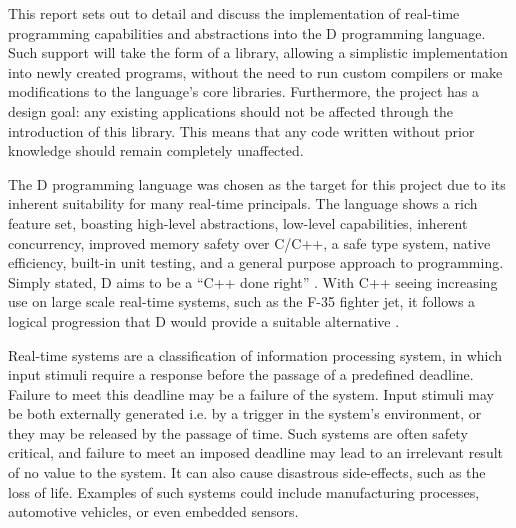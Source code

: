 






This report sets out to detail and discuss the implementation of real-time 
programming capabilities and abstractions into the D programming language. 
Such support will take the form of a library, allowing a simplistic implementation 
into newly created programs, without the need to run custom compilers or make
modifications to the language's core libraries. Furthermore, the project has a design 
goal: any existing applications should not be affected through the introduction 
of this library. This means that any code written without prior knowledge should 
remain completely unaffected. 
\par\bigskip\noindent
The D programming language was chosen as the target for this project due to its 
inherent suitability for many real-time principals. The language shows a rich 
feature set, boasting high-level abstractions, low-level capabilities, inherent 
concurrency, improved memory safety over C/C++, a safe type 
system, native efficiency, built-in unit testing,  and a general purpose approach 
to programming. Simply stated, D aims to be a ``C++ done right'' \cite{qznc-tutorial}. 
With C++ seeing increasing use on large scale real-time systems, such as the F-35 
fighter jet, it follows a logical progression that D would provide a suitable 
alternative \cite{f35}.
\par\bigskip\noindent
Real-time systems are a classification of 
information processing system, in which input
stimuli require a response before the passage of a predefined deadline. Failure 
to meet this deadline may be a failure of the system. Input 
stimuli may be both externally generated i.e. by a trigger in the system's 
environment, or they may be released by the passage of time. Such systems are 
often safety critical, and failure to meet an imposed deadline may lead to 
an irrelevant result of no value to the system. It can also cause disastrous side-effects, 
such as the loss of life. Examples of such systems could include 
manufacturing processes, automotive vehicles, or even embedded sensors. 
